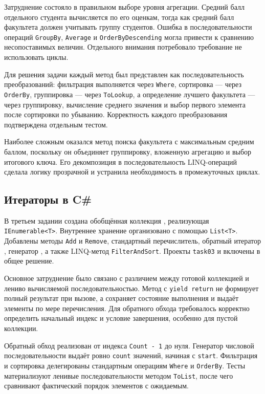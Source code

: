 Затруднение состояло в правильном выборе уровня агрегации. Средний балл отдельного студента вычисляется по его оценкам, тогда как средний балл факультета должен учитывать группу студентов. Ошибка в последовательности операций \texttt{GroupBy}, \texttt{Average} и \texttt{OrderByDescending} могла привести к сравнению несопоставимых величин. Отдельного внимания потребовало требование не использовать циклы.

Для решения задачи каждый метод был представлен как последовательность преобразований: фильтрация выполняется через \texttt{Where}, сортировка --- через \texttt{OrderBy}, группировка --- через \texttt{ToLookup}, а определение лучшего факультета --- через группировку, вычисление среднего значения и выбор первого элемента после сортировки по убыванию. Корректность каждого преобразования подтверждена отдельным тестом.

Наиболее сложным оказался метод поиска факультета с максимальным средним баллом, поскольку он объединяет группировку, вложенную агрегацию и выбор итогового ключа. Его декомпозиция в последовательность LINQ-операций сделала логику прозрачной и устранила необходимость в промежуточных циклах.

\subsection{Итераторы в C\#}

В третьем задании создана обобщённая коллекция , реализующая \texttt{IEnumerable<T>}. Внутреннее хранение организовано с помощью \texttt{List<T>}. Добавлены методы \texttt{Add} и \texttt{Remove}, стандартный перечислитель, обратный итератор , генератор , а также LINQ-метод \texttt{FilterAndSort}. Проекты \texttt{task03} и  включены в общее решение.

Основное затруднение было связано с различием между готовой коллекцией и лениво вычисляемой последовательностью. Метод с \texttt{yield return} не формирует полный результат при вызове, а сохраняет состояние выполнения и выдаёт элементы по мере перечисления. Для обратного обхода требовалось корректно определить начальный индекс и условие завершения, особенно для пустой коллекции.

Обратный обход реализован от индекса \texttt{Count - 1} до нуля. Генератор числовой последовательности выдаёт ровно \texttt{count} значений, начиная с \texttt{start}. Фильтрация и сортировка делегированы стандартным операциям \texttt{Where} и \texttt{OrderBy}. Тесты материализуют ленивые последовательности методом \texttt{ToList}, после чего сравнивают фактический порядок элементов с ожидаемым.

